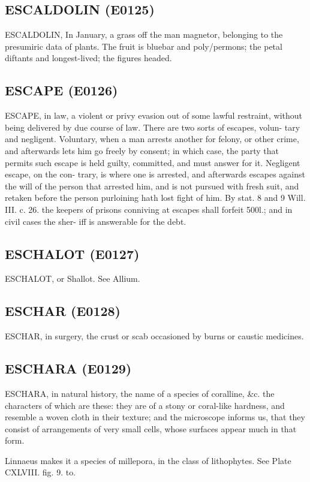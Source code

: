 \documentclass{article}
\begin{document}
\subsection*{ESCALDOLIN (E0125)}
ESCALDOLIN, In January, a grass off the man
magnetor, belonging to the presumiric data of
plants. The fruit is bluebar and poly/permons; the
petal diftants and longest-lived; the figures headed.

\subsection*{ESCAPE (E0126)}
ESCAPE, in law, a violent or privy evasion out of
some lawful restraint, without being delivered by due
course of law. There are two sorts of escapes, volun-
tary and negligent. Voluntary, when a man arrests
another for felony, or other crime, and afterwards lets
him go freely by consent; in which case, the party
that permits such escape is held guilty, committed,
and must answer for it. Negligent escape, on the con-
trary, is where one is arrested, and afterwards escapes
against the will of the person that arrested him, and is
not pursued with fresh suit, and retaken before the
person purloining hath lost fight of him. By stat. 8 and
9 Will. III. c. 26. the keepers of prisons conniving at
escapes shall forfeit 500l.; and in civil cases the sher-
iff is answerable for the debt.

\subsection*{ESCHALOT (E0127)}
ESCHALOT, or Shallot. See Allium.

\subsection*{ESCHAR (E0128)}
ESCHAR, in surgery, the crust or scab occasioned
by burns or caustic medicines.

\subsection*{ESCHARA (E0129)}
ESCHARA, in natural history, the name of a species of coralline, \&c. the characters of which are these: they are of a stony or coral-like hardness, and resemble a woven cloth in their texture; and the microscope informs us, that they consist of arrangements of very small cells, whose surfaces appear much in that form.

Linnaeus makes it a species of millepora, in the class of lithophytes. See Plate CXLVIII. fig. 9. to.
\end{document}
